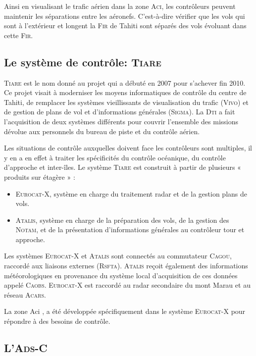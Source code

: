 Ainsi en visualisant le trafic aérien dans la zone \textsc{Aci}, les contrôleurs peuvent maintenir les séparations entre les aéronefs. C'est-à-dire vérifier que les vols qui sont à l’extérieur et longent la \textsc{Fir} de Tahiti sont séparés des vols évoluant dans cette \textsc{Fir}.

    \subsection{Le système de contrôle: \textsc{Tiare}}
\textsc{Tiare} est le nom donné au projet qui a débuté en 2007 pour s'achever fin 2010. Ce projet visait à moderniser les moyens informatiques de contrôle du centre de Tahiti, de remplacer les systèmes vieillissants de visualisation du trafic (\textsc{Vivo}) et de gestion de plans de vol et d'informations générales (\textsc{Sigma}). La \textsc{Dti} a fait l'acquisition de deux systèmes différents pour couvrir l’ensemble des missions dévolue aux personnels du bureau de piste et du contrôle aérien.

Les situations de contrôle auxquelles doivent face les contrôleurs sont multiples, il y en a en effet à traiter les spécificités du contrôle océanique, du contrôle d’approche et inter-îles. Le système \textsc{Tiare} est construit à partir de plusieurs « produits sur étagère » :
\begin{itemize}
  \item \textsc{Eurocat-X}, système en charge du traitement radar et de la gestion plans de vols.
  \item \textsc{Atalis}, système en charge de la préparation des vols, de la gestion des \textsc{Notam}, et de la présentation d’informations générales au contrôleur tour et approche.
\end{itemize}\medskip

Les systèmes \textsc{Eurocat-X} et \textsc{Atalis} sont connectés au commutateur \textsc{Cagou}, raccordé aux liaisons externes (\textsc{Rsfta}). \textsc{Atalis} reçoit également des informations météorologiques en provenance du système local d’acquisition de ces données appelé \textsc{Caobs}. \textsc{Eurocat-X} est raccordé au radar secondaire du mont Marau et au réseau \textsc{Acars}.


La zone Aci , a été développée spécifiquement dans le système \textsc{Eurocat-X} pour répondre à des besoins de contrôle.


    \subsection{L'\textsc{Ads-C}}

